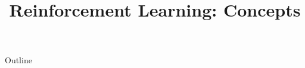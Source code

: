 \documentclass[xcolor=dvipsnames,compress,t,pdf,9pt]{beamer}
\title[\insertframenumber /\inserttotalframenumber]{Reinforcement Learning: Concepts}
\begin{document}
	\begin{frame}
	\titlepage
	\end{frame}

	\begin{frame}{Outline}
	    \tableofcontents
	\end{frame}

	
	
	
\end{document}
